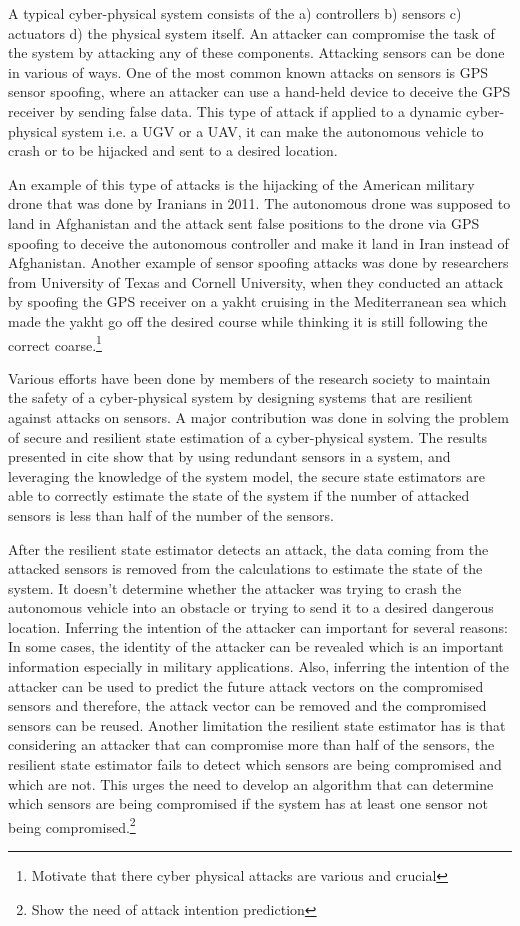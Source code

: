 \documentclass[conference]{IEEEtran}
\begin{document}
A typical cyber-physical system consists of the a) controllers b) sensors c) actuators d) the physical system itself. An attacker can compromise the task of the system by attacking any of these components. Attacking sensors can be done in various of ways. One of the most common known attacks on sensors is GPS sensor spoofing, where an attacker can use a hand-held device to deceive the GPS receiver by sending false data. This type of attack if applied to a dynamic cyber-physical system i.e. a UGV or a UAV, it can make the autonomous vehicle to crash or to be hijacked and sent to a desired location.

An example of this type of attacks is the hijacking of the American military drone that was done by Iranians in 2011. The autonomous drone was supposed to land in Afghanistan and the attack sent false positions to the drone via GPS spoofing to deceive the autonomous controller and make it land in Iran instead of Afghanistan. Another example of sensor spoofing attacks was done by researchers from University of Texas and Cornell University, when they conducted an attack by spoofing the GPS receiver on a yakht cruising in the Mediterranean sea which made the yakht go off the desired course while thinking it is still following the correct coarse.\footnote{Motivate that there cyber physical attacks are various and crucial}

Various efforts have been done by members of the research society to maintain the safety of a cyber-physical system by designing systems that are resilient against attacks on sensors. A major contribution was done in solving the problem of secure and resilient state estimation of a cyber-physical system. The results presented in cite show that by using redundant sensors in a system, and leveraging the knowledge of the system model, the secure state estimators are able to correctly estimate the state of the system if the number of attacked sensors is less than half of the number of the sensors.

After the resilient state estimator detects an attack, the data coming from the attacked sensors is removed from the calculations to estimate the state of the system. It doesn't determine whether the attacker was trying to crash the autonomous vehicle into an obstacle or trying to send it to a desired dangerous location. Inferring the intention of the attacker can important for several reasons: In some cases, the identity of the attacker can be revealed which is an important information especially in military applications. Also, inferring the intention of the attacker can be used to predict the future attack vectors on the compromised sensors and therefore, the attack vector can be removed and the compromised sensors can be reused. Another limitation the resilient state estimator has is that considering an attacker that can compromise more than half of the sensors, the resilient state estimator fails to detect which sensors are being compromised and which are not. This urges the need to develop an algorithm that can determine which sensors are being compromised if the system has at least one sensor not being compromised.\footnote{Show the need of attack intention prediction}
\end{document}
